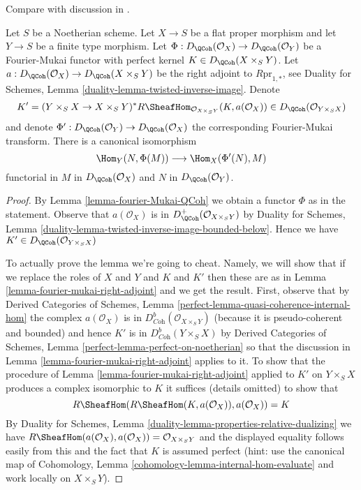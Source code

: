 \begin{lemma}
\label{lemma-fourier-mukai-left-adjoint}
\begin{reference}
Compare with discussion in \cite{Rizzardo}.
\end{reference}
Let $S$ be a Noetherian scheme. Let $X \to S$ be a flat proper
morphism and let $Y \to S$ be a finite type morphism. Let
$\Phi : D_\QCoh(\mathcal{O}_X) \to D_\QCoh(\mathcal{O}_Y)$
be a Fourier-Mukai functor with perfect kernel
$K \in D_\QCoh(X \times_S Y)$.
Let $a : D_\QCoh(\mathcal{O}_X) \to  D_\QCoh(X \times_S Y)$
be the right adjoint to $R\text{pr}_{1, *}$, see
Duality for Schemes, Lemma \ref{duality-lemma-twisted-inverse-image}.
Denote
$$
K' = (Y \times_S X \to X \times_S Y)^*
R\SheafHom_{\mathcal{O}_{X \times_S Y}}(K, a(\mathcal{O}_X)) \in
D_\QCoh(\mathcal{O}_{Y \times_S X})
$$
and denote $\Phi' : D_\QCoh(\mathcal{O}_Y) \to D_\QCoh(\mathcal{O}_X)$
the corresponding Fourier-Mukai transform. There is a canonical
isomorphism
$$
\Hom_Y(N, \Phi(M)) \longrightarrow \Hom_X(\Phi'(N), M)
$$
functorial in $M$ in $D_\QCoh(\mathcal{O}_X)$ and $N$ in
$D_\QCoh(\mathcal{O}_Y)$.
\end{lemma}

\begin{proof}
By Lemma \ref{lemma-fourier-Mukai-QCoh} we obtain a functor $\Phi$
as in the statement. Observe that $a(\mathcal{O}_X)$ is in
$D^+_\QCoh(\mathcal{O}_{X \times_S Y})$ by Duality for Schemes,
Lemma \ref{duality-lemma-twisted-inverse-image-bounded-below}.
Hence we have $K' \in D_\QCoh(\mathcal{O}_{Y \times_S X})$

\medskip\noindent
To actually prove the lemma we're going to cheat. Namely, we will
show that if we replace the roles of $X$ and $Y$ and $K$ and $K'$
then these are as in Lemma \ref{lemma-fourier-mukai-right-adjoint}
and we get the result. First, observe that by
Derived Categories of Schemes, Lemma
\ref{perfect-lemma-quasi-coherence-internal-hom}
the complex $a(\mathcal{O}_X)$ is in
$D^b_{\textit{Coh}}(\mathcal{O}_{X \times_S Y})$
(because it is pseudo-coherent and bounded) and
hence $K'$ is in $D^b_{\textit{Coh}}(Y \times_S X)$
by Derived Categories of Schemes, Lemma
\ref{perfect-lemma-perfect-on-noetherian}
so that the discussion in Lemma \ref{lemma-fourier-mukai-right-adjoint}
applies to it. To show that the procedure of
Lemma \ref{lemma-fourier-mukai-right-adjoint} applied to $K'$ on $Y \times_S X$
produces a complex isomorphic to $K$ it suffices
(details omitted) to show that
$$
R\SheafHom(R\SheafHom(K, a(\mathcal{O}_X)), a(\mathcal{O}_X)) = K
$$
By Duality for Schemes, Lemma \ref{duality-lemma-properties-relative-dualizing}
we have $R\SheafHom(a(\mathcal{O}_X), a(\mathcal{O}_X)) =
\mathcal{O}_{X \times_S Y}$ and the displayed equality follows easily
from this and the fact that $K$ is assumed perfect (hint: use the
canonical map of
Cohomology, Lemma \ref{cohomology-lemma-internal-hom-evaluate} and work
locally on $X \times_S Y$).
\end{proof}

